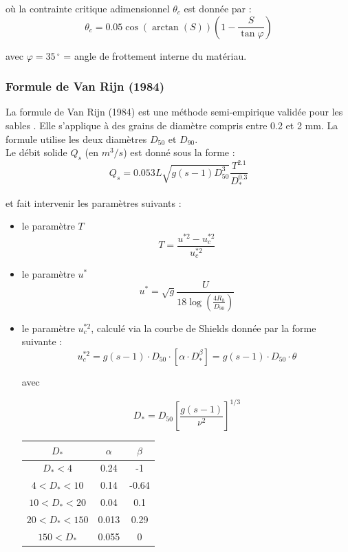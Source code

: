 \documentclass[a4paper,10pt]{article}
\begin{document}
o\`u la contrainte critique adimensionnel $\theta_c$ est donn\'ee par :
$$ \theta_c = 0.05 \cos( \arctan(S) ) \left(1-\frac{S}{\tan \varphi}\right) $$

\indent
avec $\varphi = 35\,^{\circ}$ = angle de frottement interne du mat\'eriau.


\subsubsection{Formule de Van Rijn (1984)}

\noindent
La formule de Van Rijn (1984) est une m\'ethode semi-empirique valid\'ee pour les sables \cite{van1}. Elle s'applique \`a des grains de diam\`etre compris entre 0.2 et 2 mm. La formule utilise les deux diam\`etres $D_{50} $ et $ D_{90}$. \\

\noindent
Le d\'ebit solide $Q_s$ (en $m^3/s$) est donn\'e sous la forme :
$$ Q_s = 0.053 L \sqrt{g (s-1) D_{50}^3} \frac{T^{2.1}}{D_*^{0.3}} $$

\noindent
et fait intervenir les param\`etres suivants :
\begin{itemize}
\item le param\`etre $T$
$$ T = \frac{u^{*2}-u_c^{*2}}{u_c^{*2}} $$

\item le param\`etre $u^*$
$$ u^* = \sqrt{g} \frac{U}{18 \log\left(\frac{4R_h}{D_{90}}\right) } $$

\item le param\`etre $u_c^{*2}$, calcul\'e via la courbe de Shields donn\'ee par la forme suivante :
$$ u_c^{*2} = g (s-1) \cdot D_{50} \cdot [ \alpha \cdot D_*^\beta ] = g (s-1) \cdot D_{50} \cdot \theta $$

avec

$$ D_* = D_{50} \left[\frac{g(s-1)}{\nu^2}\right]^{1/3} $$

\begin{center}
\begin{tabular}{| c | c | c |}
\hline
$D_*$			& $\alpha$		& $\beta$	\\ \hline
$D_* < 4$		&	0.24		& -1		\\
$4<D_*<10$		&	0.14		& -0.64		\\
$10<D_*<20$		&	0.04		& 0.1		\\
$20<D_*<150$	&	0.013		& 0.29		\\
$150<D_*$		&	0.055		& 0			\\ \hline
\end{tabular}
\end{center}
\end{itemize}
\end{document}
